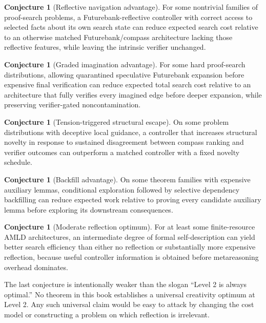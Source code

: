 \documentclass[11pt,openany]{book}
\theoremstyle{definition}
\newtheorem{conjecture}[theorem]{Conjecture}
\theoremstyle{remark}
\begin{document}
\begin{conjecture}[Reflective navigation advantage]\label{conj:reflect}
For some nontrivial families of proof-search problems, a Futurebank-reflective controller with correct access to selected facts about its own search state can reduce expected search cost relative to an otherwise matched Futurebank/compass architecture lacking those reflective features, while leaving the intrinsic verifier unchanged.
\end{conjecture}

\begin{conjecture}[Graded imagination advantage]\label{conj:graded}
For some hard proof-search distributions, allowing quarantined speculative Futurebank expansion before expensive final verification can reduce expected total search cost relative to an architecture that fully verifies every imagined edge before deeper expansion, while preserving verifier-gated noncontamination.
\end{conjecture}

\begin{conjecture}[Tension-triggered structural escape]\label{conj:tension}
On some problem distributions with deceptive local guidance, a controller that increases structural novelty in response to sustained disagreement between compass ranking and verifier outcomes can outperform a matched controller with a fixed novelty schedule.
\end{conjecture}

\begin{conjecture}[Backfill advantage]\label{conj:backfill}
On some theorem families with expensive auxiliary lemmas, conditional exploration followed by selective dependency backfilling can reduce expected work relative to proving every candidate auxiliary lemma before exploring its downstream consequences.
\end{conjecture}

\begin{conjecture}[Moderate reflection optimum]\label{conj:lev2}
For at least some finite-resource AMLD architectures, an intermediate degree of formal self-description can yield better search efficiency than either no reflection or substantially more expensive reflection, because useful controller information is obtained before metareasoning overhead dominates.
\end{conjecture}

The last conjecture is intentionally weaker than the slogan ``Level 2 is always optimal.'' No theorem in this book establishes a universal creativity optimum at Level 2. Any such universal claim would be easy to attack by changing the cost model or constructing a problem on which reflection is irrelevant.
\end{document}
